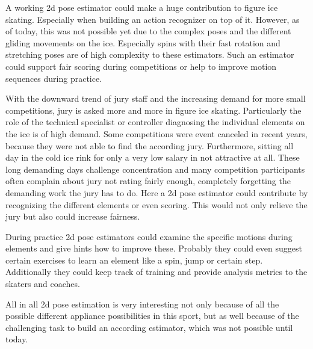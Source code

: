 \begin{flushleft}
\begin{flushleft}
A working 2d pose estimator could make a huge contribution to figure ice skating. 
Especially when building an action recognizer on top of it. 
However, as of today, this was not possible yet due to the complex poses and the different gliding movements on the ice.
Especially spins with their fast rotation and stretching poses are of high complexity to these estimators.
Such an estimator could support fair scoring during competitions or help to improve motion sequences during practice.
\end{flushleft}
\begin{flushleft}
With the downward trend of jury staff and the increasing demand for more small competitions, jury is asked more and more in figure ice skating.
Particularly the role of the technical specialist or controller diagnosing the individual elements on the ice is of high demand.
Some competitions were event canceled in recent years, because they were not able to find the according jury.
Furthermore, sitting all day in the cold ice rink for only a very low salary in not attractive at all.
These long demanding days challenge concentration and many competition participants often complain about jury not rating fairly enough,
completely forgetting the demanding work the jury has to do.
Here a 2d pose estimator could contribute by recognizing the different elements or even scoring. 
This would not only relieve the jury but also could increase fairness.
\end{flushleft}
\begin{flushleft}
During practice 2d pose estimators could examine the specific motions during elements and give hints how to improve these.
Probably they could even suggest certain exercises to learn an element like a spin, jump or certain step. 
Additionally they could keep track of training and provide analysis metrics to the skaters and coaches.
\end{flushleft}
\begin{flushleft}
All in all 2d pose estimation is very interesting not only because of all the possible different appliance possibilities in this sport,
 but as well because of the
challenging task to build an according estimator, which was not possible until today.
\end{flushleft}



\end{flushleft}
